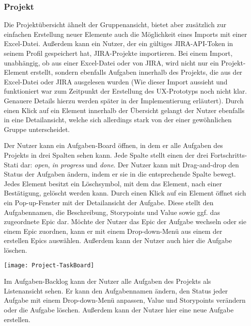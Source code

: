 \subsubsection{Projekt}
Die Projektübersicht ähnelt der Gruppenansicht, bietet aber zusätzlich zur einfachen Erstellung neuer Elemente auch die Möglichkeit eines Imports mit einer Excel-Datei. Außerdem kann ein Nutzer, der ein gültiges JIRA-API-Token in seinem Profil gespeichert hat, JIRA-Projekte importieren. Bei einem Import, unabhängig, ob aus einer Excel-Datei oder von JIRA, wird nicht nur ein Projekt-Element erstellt, sondern ebenfalls Aufgaben innerhalb des Projekts, die aus der Excel-Datei oder JIRA ausgelesen wurden (Wie dieser Import aussieht und funktioniert war zum Zeitpunkt der Erstellung des UX-Prototyps noch nicht klar. Genauere Details hierzu werden später in der Implementierung erläutert).
Durch einen Klick auf ein Element innerhalb der Übersicht gelangt der Nutzer ebenfalls in eine Detailansicht, welche sich allerdings stark von der einer gewöhnlichen Gruppe unterscheidet.

Der Nutzer kann ein Aufgaben-Board öffnen, in dem er alle Aufgaben des Projekts in drei Spalten sehen kann. Jede Spalte stellt einen der drei Fortschritts-Stati dar: \emph{open}, \emph{in progress} und \emph{done}. Der Nutzer kann mit Drag-and-drop den Status der Aufgaben ändern, indem er sie in die entsprechende Spalte bewegt. Jedes Element besitzt ein Löschsymbol, mit dem das Element, nach einer Bestätigung, gelöscht werden kann. Durch einen Klick auf ein Element öffnet sich ein Pop-up-Fenster mit der Detailansicht der Aufgabe. Diese stellt den Aufgabennamen, die Beschreibung, Storypoints und Value sowie ggf. das zugeordnete Epic dar. Möchte der Nutzer das Epic der Aufgabe wechseln oder sie einem Epic zuordnen, kann er mit einem Drop-down-Menü aus einem der erstellen Epics auswählen. Außerdem kann der Nutzer auch hier die Aufgabe löschen.

\vspace{20pt}
\begin{center}
    \begin{minipage}{\linewidth}
        \texttt{[image: Project-TaskBoard]}
    \end{minipage}
\end{center}
\vspace{20pt}

Im Aufgaben-Backlog kann der Nutzer alle Aufgaben des Projekts als Listenansicht sehen. Er kann den Aufgabennamen ändern, den Status jeder Aufgabe mit einem Drop-down-Menü anpassen, Value und Storypoints verändern oder die Aufgabe löschen. Außerdem kann der Nutzer hier eine neue Aufgabe erstellen.

